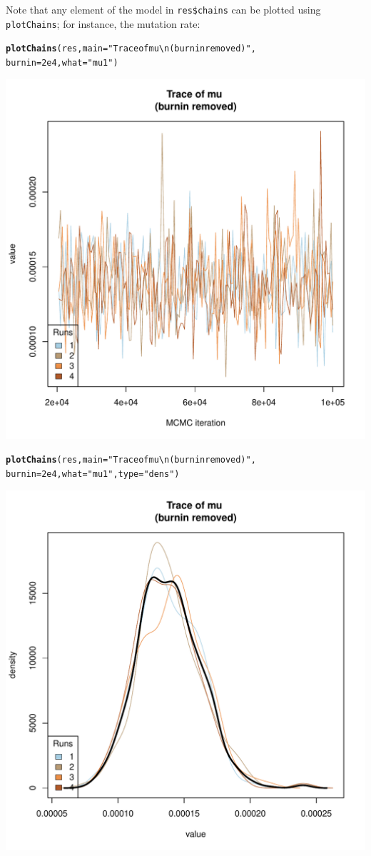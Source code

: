 \documentclass{article}\usepackage[]{graphicx}\usepackage[]{color}
\makeatletter
\newcommand{\hlnum}[1]{\textcolor[rgb]{0.686,0.059,0.569}{#1}}%
\newcommand{\hlstr}[1]{\textcolor[rgb]{0.192,0.494,0.8}{#1}}%
\newcommand{\hlstd}[1]{\textcolor[rgb]{0.345,0.345,0.345}{#1}}%
\newcommand{\hlkwc}[1]{\textcolor[rgb]{0.333,0.667,0.333}{#1}}%
\newcommand{\hlkwd}[1]{\textcolor[rgb]{0.737,0.353,0.396}{\textbf{#1}}}%
\newenvironment{kframe}{%
 \def\at@end@of@kframe{}%
 \ifinner\ifhmode%
  \def\at@end@of@kframe{\end{minipage}}%
  \begin{minipage}{\columnwidth}%
 \fi\fi%
 \def\FrameCommand##1{\hskip\@totalleftmargin \hskip-\fboxsep
 \colorbox{shadecolor}{##1}\hskip-\fboxsep
     \hskip-\linewidth \hskip-\@totalleftmargin \hskip\columnwidth}%
 \MakeFramed {\advance\hsize-\width
   \@totalleftmargin\z@ \linewidth\hsize
   \@setminipage}}%
 {\par\unskip\endMakeFramed%
 \at@end@of@kframe}
\newenvironment{knitrout}{}{} %
\makeatother
\begin{document}
Note that any element of the model in \texttt{res\$chains} can be plotted using \texttt{plotChains};
for instance, the mutation rate:
\begin{knitrout}
\color{fgcolor}\begin{kframe}
\begin{alltt}
\hlkwd{plotChains}\hlstd{(res,} \hlkwc{main}\hlstd{=}\hlstr{"Trace of mu \textbackslash{}n(burnin removed)"}\hlstd{,}
           \hlkwc{burnin}\hlstd{=}\hlnum{2e4}\hlstd{,} \hlkwc{what}\hlstd{=}\hlstr{"mu1"}\hlstd{)}
\end{alltt}
\end{kframe}

{\centering \includegraphics[width=.6\textwidth]{figs/unnamed-chunk-311} 

}


\begin{kframe}\begin{alltt}
\hlkwd{plotChains}\hlstd{(res,} \hlkwc{main}\hlstd{=}\hlstr{"Trace of mu \textbackslash{}n(burnin removed)"}\hlstd{,}
           \hlkwc{burnin}\hlstd{=}\hlnum{2e4}\hlstd{,} \hlkwc{what}\hlstd{=}\hlstr{"mu1"}\hlstd{,} \hlkwc{type}\hlstd{=}\hlstr{"dens"}\hlstd{)}
\end{alltt}
\end{kframe}

{\centering \includegraphics[width=.6\textwidth]{figs/unnamed-chunk-312} 

}



\end{knitrout}
\end{document}
